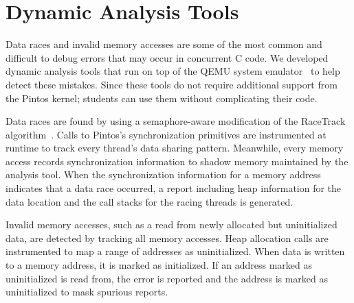 \section{Dynamic Analysis Tools}
\label{sec:dynamicanalysis}

Data races and invalid memory accesses are some of the most common and
difficult to debug errors that may occur in concurrent C code.
We developed dynamic analysis tools that run on top of the QEMU
system emulator~\cite{Bellard2005QEMU} to help detect these mistakes. 
Since these tools do not require additional support from the Pintos kernel; 
students can use them without complicating their code.

Data races are found by using a semaphore-aware modification of the RaceTrack algorithm~\cite{Yu2005RaceTrack}. 
Calls to Pintos's synchronization primitives are instrumented at runtime to track every thread's data
sharing pattern.  Meanwhile, every memory access records synchronization information to shadow memory
maintained by the analysis tool. When the synchronization information for a memory address
indicates that a data race occurred, a report including heap information for the data location and the
call stacks for the racing threads is generated.

Invalid memory accesses, such as a read from newly allocated but uninitialized data, are detected by
tracking all memory accesses.  Heap allocation calls are instrumented to map a range of addresses as
uninitialized. When data is written to a memory address, it is marked as initialized. If an address
marked as uninitialized is read from, the error is reported and the address is marked as
uninitialized to mask spurious reports. 

